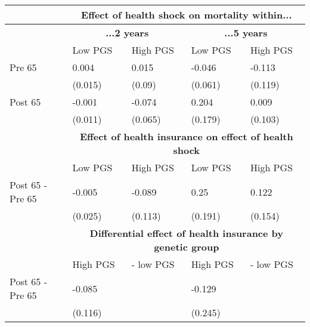 % 
\begin{tabular}{l| p{2.5cm}p{2.5cm}| p{2.5cm}p{2.5cm}}
  & \multicolumn{4}{c}{\textbf{Effect of health shock on mortality within...}} \\
 \toprule
  & \multicolumn{2}{c}{ \textbf{...2 years}} &  \multicolumn{2}{c}{ \textbf{...5 years}}  \\
 \midrule
 & Low PGS & High PGS & Low PGS & High PGS \\ 
   \midrule
Pre 65 & 0.004 & 0.015 & -0.046 & -0.113 \\ 
   & (0.015) & (0.09) & (0.061) & (0.119) \\ 
  Post 65 & -0.001 & -0.074 & 0.204 & 0.009 \\ 
   & (0.011) & (0.065) & (0.179) & (0.103) \\ 
   \toprule & \multicolumn{4}{c}{ \textbf{Effect of health insurance on effect of health shock}} \\
 \midrule
 & Low PGS & High PGS & Low PGS & High PGS \\ 
   \midrule
Post 65 - Pre 65 & -0.005 & -0.089 & 0.25 & 0.122 \\ 
   & (0.025) & (0.113) & (0.191) & (0.154) \\ 
   \toprule & \multicolumn{4}{c}{ \textbf{Differential effect of health insurance by genetic group}} \\
 \midrule
 & High PGS  & - low PGS & High PGS  & - low PGS \\ 
   \midrule
Post 65 - Pre 65 & -0.085 &  & -0.129 &  \\ 
   & (0.116) &  & (0.245) &  \\ 
  \end{tabular}
